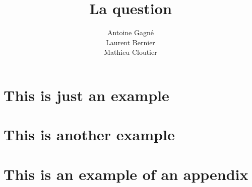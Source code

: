 \documentclass[12pt]{GDD}
\author{%
    Antoine Gagné \\%
    Laurent Bernier \\%
    Mathieu Cloutier%
}
\title{La question}
\begin{document}
\chapter{This is just an example}
\lipsum

\chapter{This is another example}
\lipsum

\appendix

\chapter{This is an example of an appendix}
\lipsum
\end{document}
